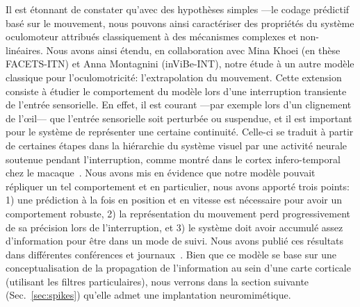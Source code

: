 Il est étonnant de constater qu'avec des hypothèses simples ---le codage prédictif basé sur le mouvement, nous pouvons ainsi caractériser des propriétés du système oculomoteur attribués classiquement à des mécanismes complexes et non-linéaires. Nous avons ainsi étendu, en collaboration avec Mina Khoei (en thèse FACETS-ITN) et Anna Montagnini (inViBe-INT), notre étude à un autre modèle classique pour l'oculomotricité: l'extrapolation du mouvement.
Cette extension consiste à étudier le comportement du modèle lors d'une interruption transiente de l'entrée sensorielle. En effet, il est courant ---par exemple lors d'un clignement de l'\oe il--- que l'entrée sensorielle soit perturbée ou suspendue, et il est important pour le système de représenter une certaine continuité. Celle-ci se traduit à partir de certaines étapes dans la hiérarchie du système visuel par une activité neurale soutenue pendant l'interruption, comme montré dans le cortex infero-temporal chez le macaque~\citep{Assad95}. Nous avons mis en évidence que notre modèle pouvait répliquer un tel comportement et en particulier, nous avons apporté trois points: 1) une prédiction à la fois en position et en vitesse est nécessaire pour avoir un comportement robuste, 2) la représentation du mouvement perd progressivement de sa précision lors de l'interruption, et 3) le système doit avoir accumulé assez d'information pour être dans un mode de suivi. Nous avons publié ces résultats dans différentes conférences et journaux~\citep{Khoei13jpp,KhoeiMassonPerrinet17}. Bien que ce modèle se base sur une conceptualisation de la propagation de l'information au sein d'une carte corticale (utilisant les filtres particulaires), nous verrons dans la section suivante (Sec.~\ref{sec:spikes}) qu'elle admet une implantation neuromimétique.
%
%
